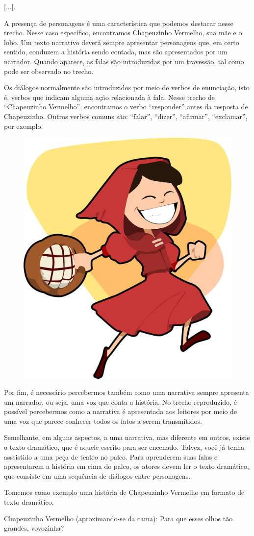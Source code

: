 {{[}...{]}.
\bigskip

A presença de personagens é uma característica que podemos destacar
nesse trecho. Nesse caso específico, encontramos Chapeuzinho Vermelho,
sua mãe e o lobo. Um texto narrativo deverá sempre apresentar
personagens que, em certo sentido, conduzem a história sendo contada,
mas são apresentados por um narrador. Quando aparece, as falas são
introduzidas por um travessão, tal como pode ser observado no trecho.

Os diálogos normalmente são introduzidos por meio de verbos de
enunciação, isto é, verbos que indicam alguma ação relacionada à fala.
Nesse trecho de “Chapeuzinho Vermelho”, encontramos o verbo “responder”
antes da resposta de Chapeuzinho. Outros verbos comuns são: “falar”,
“dizer”, “afirmar”, “exclamar”, por exemplo.

\begin{figure}
\includegraphics[width=.3\textwidth]{./imgs/img5.png}
\end{figure}

Por fim, é necessário percebermos também como uma narrativa sempre
apresenta um narrador, ou seja, uma voz que conta a história. No trecho
reproduzido, é possível percebermos como a narrativa é apresentada
aos leitores por meio de uma voz que parece conhecer todos os fatos a
serem transmitidos.

Semelhante, em alguns aspectos, a uma narrativa, mas diferente em outros, existe o texto dramático, que é aquele escrito para ser encenado. Talvez, você já tenha asssistido a uma peça de teatro no palco. Para aprenderem suas falas
e apresentarem a história em cima do palco, os atores devem ler o texto
dramático, que consiste em uma sequência de diálogos
entre personagens.

Tomemos como exemplo uma história de Chapeuzinho
Vermelho em formato de texto dramático.

\bigskip
Chapeuzinho Vermelho (aproximando-se da cama): Para que esses olhos
tão grandes, vovozinha?

}
